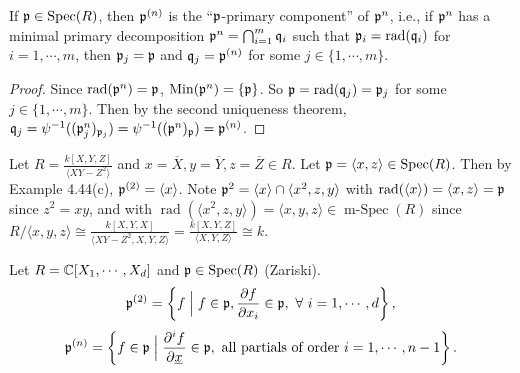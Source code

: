 \begin{proposition}
    If $\mathfrak{p} \in \operatorname{Spec}(R)$, then $\mathfrak{p}^{(n)}$ is the ``$\mathfrak{p}$-primary component'' of $\mathfrak{p}^{n}$, i.e., if $\mathfrak{p}^{n}$ has a minimal primary decomposition $\mathfrak{p}^{n} = \bigcap_{i=1}^{m} \mathfrak{q}_i$ such that $\mathfrak{p}_i = \operatorname{rad}(\mathfrak{q}_i)$ for $i = 1,\cdots,m$, then $\mathfrak{p}_j = \mathfrak{p}$ and $\mathfrak{q}_j = \mathfrak{p}^{(n)}$ for some $j \in \{1,\cdots,m\}$. 
\end{proposition}

\begin{proof}
    Since $\operatorname{rad}(\mathfrak{p}^{n}) = \mathfrak{p}$, $\operatorname{Min}(\mathfrak{p}^{n}) = \{\mathfrak{p}\}$. So $\mathfrak{p} = \operatorname{rad}(\mathfrak{q}_j) = \mathfrak{p}_j$ for some $j \in \{1,\cdots,m\}$. Then by the second uniqueness theorem, $\mathfrak{q}_j = \psi^{-1}((\mathfrak{p}_j^{n})_{\mathfrak{p}_j}) = \psi^{-1}((\mathfrak{p}^{n})_{\mathfrak{p}}) = \mathfrak{p}^{(n)}$.
\end{proof}

\begin{example}
    Let $R = \frac{k[X,Y,Z]}{\langle XY-Z^{2} \rangle}$ and $x = \overbar{X}, y = \overbar{Y}, z = \overbar{Z} \in R$. Let $\mathfrak{p} = \langle x,z \rangle \in \operatorname{Spec}(R)$. Then by Example 4.44(c), $\mathfrak{p}^{(2)} = \langle x \rangle$. Note $\mathfrak{p}^{2} = \langle x \rangle \cap \langle x^{2},z,y \rangle$ with $\operatorname{rad}(\langle x \rangle) = \langle x,z \rangle = \mathfrak{p}$ since $z^{2} = xy$, and with $\operatorname{rad}(\langle x^{2},z,y \rangle) = \langle x,y,z \rangle \in \operatorname{m-Spec}(R)$ since $R/\langle x,y,z \rangle \cong \frac{k[X,Y,X]}{\langle XY-Z^{2},X,Y,Z \rangle} = \frac{k[X,Y,Z]}{\langle X,Y,Z \rangle} \cong k$.
\end{example}

\begin{definition}
    Let $R = \mathbb{C}[X_1,\cdots,X_d]$ and $\mathfrak{p} \in \operatorname{Spec}(R)$ (Zariski). 
    \[\mathfrak{p}^{(2)} = \left\{f \mathrel{\Big |} f \in \mathfrak{p}, \frac{\partial f}{ \partial x_i} \in \mathfrak{p},\ \forall \  i = 1,\cdots,d\right\},\] 
    \[\mathfrak{p}^{(n)} = \left\{f \in \mathfrak{p} \mathrel{\Big |} \frac{\partial^{i} f}{\partial \underline x} \in \mathfrak{p}, \text{ all partials of order } i = 1,\cdots,n-1\right\}.\]
\end{definition}
